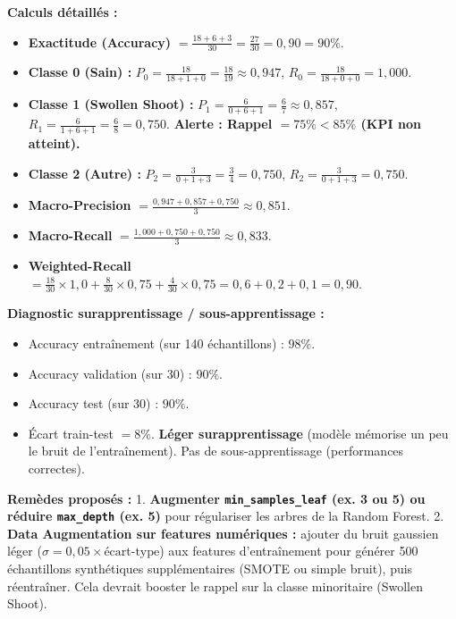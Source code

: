 \documentclass[11pt]{article}
\begin{document}
\begin{exoresolu}
\textbf{Calculs détaillés :}
\begin{itemize}
    \item \textbf{Exactitude (Accuracy)} $= \frac{18+6+3}{30} = \frac{27}{30} = 0,90 = 90\%$.
    \item \textbf{Classe 0 (Sain) :} $P_0 = \frac{18}{18+1+0} = \frac{18}{19} \approx 0,947$, $R_0 = \frac{18}{18+0+0} = 1,000$.
    \item \textbf{Classe 1 (Swollen Shoot) :} $P_1 = \frac{6}{0+6+1} = \frac{6}{7} \approx 0,857$, $R_1 = \frac{6}{1+6+1} = \frac{6}{8} = 0,750$. \textbf{Alerte : Rappel $= 75\% < 85\%$ (KPI non atteint).}
    \item \textbf{Classe 2 (Autre) :} $P_2 = \frac{3}{0+1+3} = \frac{3}{4} = 0,750$, $R_2 = \frac{3}{0+1+3} = 0,750$.
    \item \textbf{Macro-Precision} $= \frac{0,947+0,857+0,750}{3} \approx 0,851$.
    \item \textbf{Macro-Recall} $= \frac{1,000+0,750+0,750}{3} \approx 0,833$.
    \item \textbf{Weighted-Recall} $= \frac{18}{30}\times1,0 + \frac{8}{30}\times0,75 + \frac{4}{30}\times0,75 = 0,6 + 0,2 + 0,1 = 0,90$.
\end{itemize}

\textbf{Diagnostic surapprentissage / sous-apprentissage :}
\begin{itemize}
    \item Accuracy entraînement (sur 140 échantillons) : $98\%$.
    \item Accuracy validation (sur 30) : $90\%$.
    \item Accuracy test (sur 30) : $90\%$.
    \item Écart train-test $= 8\%$. \textbf{Léger surapprentissage} (modèle mémorise un peu le bruit de l'entraînement). Pas de sous-apprentissage (performances correctes).
\end{itemize}
\textbf{Remèdes proposés :}
1. \textbf{Augmenter \texttt{min\_samples\_leaf} (ex. 3 ou 5) ou réduire \texttt{max\_depth} (ex. 5)} pour régulariser les arbres de la Random Forest.
2. \textbf{Data Augmentation sur features numériques :} ajouter du bruit gaussien léger ($\sigma = 0,05 \times \text{écart-type}$) aux features d'entraînement pour générer 500 échantillons synthétiques supplémentaires (SMOTE ou simple bruit), puis réentraîner. Cela devrait booster le rappel sur la classe minoritaire (Swollen Shoot).


\end{exoresolu}
\end{document}
